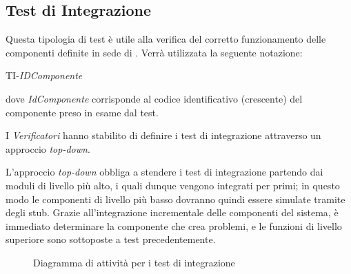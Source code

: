 \newpage
\subsection{Test di Integrazione}
Questa tipologia di test è utile alla verifica del corretto funzionamento delle componenti definite in sede di \SpecificaTecnica.
Verrà utilizzata la seguente notazione:
	\begin{center}
		TI-\textit{IDComponente}
	\end{center}
dove \textit{IdComponente} corrisponde al codice identificativo (crescente) del componente preso in esame
dal test.

I \textit{Verificatori} hanno stabilito di definire i test di integrazione attraverso un approccio  \textit{top-down}. 


L'approccio \textit{top-down} obbliga a stendere i test di integrazione partendo dai moduli
di livello più alto, i quali dunque vengono integrati per primi;
in questo modo le componenti di livello più basso dovranno quindi essere simulate tramite degli
stub. Grazie all'integrazione incrementale delle componenti del sistema, è immediato determinare
la componente che crea problemi, e le funzioni di livello superiore sono sottoposte a test precedentemente.

\begin{figure}[H]
      \begin{center}
      \caption{Diagramma di attività per i test di integrazione}
      \end{center}
\end{figure}







